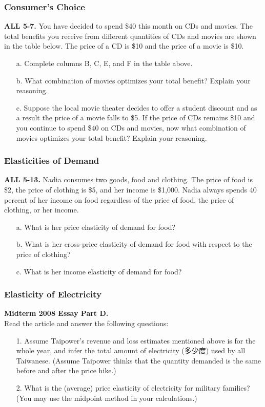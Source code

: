 \documentclass[12pt, xcolor=dvipsnames]{beamer}
\begin{document}
\begin{frame}
\frametitle{\bf Consumer's Choice}
\small \textsf{\bfseries ALL 5-7.} 
You have decided to spend \$40 this month on CDs and movies. The total benefits you receive from different quantities of CDs and movies are shown in the table below. The price of a CD is \$10 and the price of a movie is \$10.
\begin{enumerate}\itemsep-0.5ex
\item[a.] Complete columns B, C, E, and F in the table above.
\item[b.] What combination of movies optimizes your total benefit? Explain your reasoning.
\item[c.] Suppose the local movie theater decides to offer a student discount and as a result the price of a movie falls to \$5. If the price of CDs remains \$10 and you continue to spend \$40 on CDs and movies, now what combination of movies optimizes your total benefit? Explain your reasoning.
\end{enumerate}
\end{frame}




\begin{frame}
\frametitle{\bf Elasticities of Demand}
\small \textsf{\bfseries ALL 5-13.} 
Nadia consumes two goods, food and clothing. The price of food is \$2, the price of clothing is \$5, and her income is \$1,000. Nadia always spends 40 percent of her income on food regardless of the price of food, the price of clothing, or her income.
\begin{enumerate}\itemsep-0.5ex
\item[a.] What is her price elasticity of demand for food?
\item[b.] What is her cross-price elasticity of demand for food with respect to the price of clothing?
\item[c.] What is her income elasticity of demand for food?
\end{enumerate}
\end{frame}




\begin{frame}
\frametitle{\bf Elasticity of Electricity}
\small \textsf{\bfseries Midterm 2008 Essay Part D.} \\
Read the article and answer the following questions:
\begin{enumerate}\itemsep-0.5ex
\item[1.] Assume Taipower’s revenue and loss estimates mentioned above is for the whole year, and infer the total amount of electricity (多少度) used by all Taiwanese. (Assume Taipower thinks that the quantity demanded is the same before and after the price hike.)
\item[2.] What is the (average) price elasticity of electricity for military families? (You may use the midpoint method in your calculations.)
\end{enumerate}
\end{frame}
\end{document}
